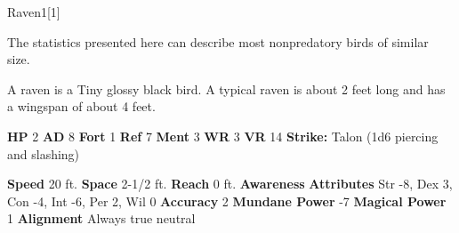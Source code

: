   
  \begin{monsection}{Raven}{1}[1]
    \vspace{-1em}\vspace{-1em}
    \vspace{0em}

    
      The statistics presented here can describe most nonpredatory birds of similar size.
    
        A raven is a Tiny glossy black bird.
        A typical raven is about 2 feet long and has a wingspan of about 4 feet.
      

    \begin{spellcontent}
      \begin{spelltargetinginfo}
        \pari \textbf{HP} 2 \monsep
          \textbf{AD} 8 \monsep
          \textbf{Fort} 1 \monsep
          \textbf{Ref} 7 \monsep
          \textbf{Ment} 3
        \pari \textbf{WR} 3 \monsep
        \textbf{VR} 14
        \pari \textbf{Strike:}
            Talon  (1d6 piercing and slashing)
      \end{spelltargetinginfo}
    \end{spellcontent}
    \begin{monsterfooter}
      \pari \textbf{Speed} 20 ft. \monsep
        \textbf{Space} 2-1/2 ft. \monsep
        \textbf{Reach} 0 ft.
      \pari \textbf{Awareness} 
      \pari \textbf{Attributes}
        Str -8, Dex 3,
        Con -4, Int -6,
        Per 2, Wil 0
      \pari \textbf{Accuracy} 2 \monsep
        \textbf{Mundane Power} -7 \monsep
      \textbf{Magical Power} 1
      \pari \textbf{Alignment} Always true neutral
    \end{monsterfooter}
  \end{monsection}
  
